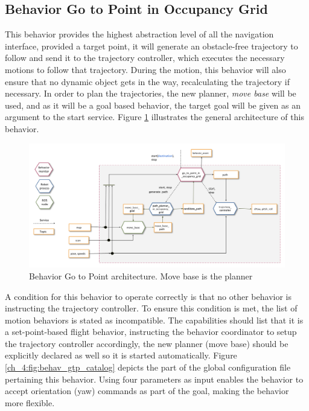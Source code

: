 \subsection{Behavior Go to Point in Occupancy Grid} \label{ch_4:subsect:behav_gtp}

  This behavior provides the highest abstraction level of all the navigation interface, provided a target point, it will generate an obstacle-free trajectory to follow and send it to the trajectory controller, which executes the necessary motions to follow that trajectory. During the motion, this behavior will also ensure that no dynamic object gets in the way, recalculating the trajectory if necessary. In order to plan the trajectories, the new planner, \textit{move base} will be used, and as it will be a goal based behavior, the target goal will be given as an argument to the start service. Figure \ref{ch_4:fig:behav_gtp} illustrates the general architecture of this behavior.

  \begin{figure}[h]
    \centering
    \includegraphics[width=\textwidth]{./Figures/BehaviorGTPArquitecture.png}
    \caption{Behavior Go to Point architecture. Move base is the planner}
    \label{ch_4:fig:behav_gtp}
  \end{figure}

  A condition for this behavior to operate correctly is that no other behavior is instructing the trajectory controller. To ensure this condition is met, the list of motion behaviors is stated as incompatible. The capabilities should list that it is a set-point-based flight behavior, instructing the behavior coordinator to setup the trajectory controller accordingly, the new planner (move base) should be explicitly declared as well so it is started automatically. Figure \ref{ch_4:fig:behav_gtp_catalog} depicts the part of the global configuration file pertaining this behavior. Using four parameters as input enables the behavior to accept orientation (yaw) commands as part of the goal, making the behavior more flexible.


